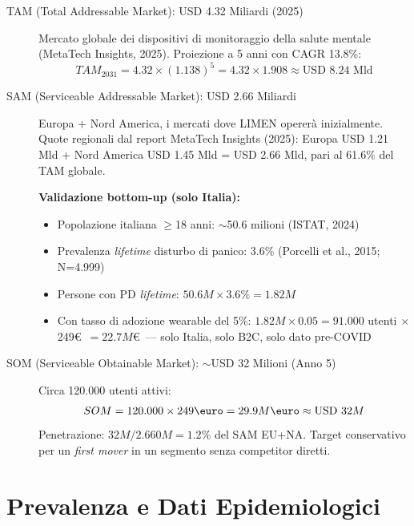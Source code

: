 \documentclass[12pt,a4paper]{article}
\begin{document}
\begin{description}
    \item[TAM (Total Addressable Market): USD 4.32 Miliardi (2025)] Mercato globale dei dispositivi di monitoraggio della salute mentale (MetaTech Insights, 2025). Proiezione a 5 anni con CAGR 13.8\%:
    $$TAM_{2031} = 4.32 \times (1.138)^5 = 4.32 \times 1.908 \approx \text{USD } 8.24 \text{ Mld}$$
    
    \item[SAM (Serviceable Addressable Market): USD 2.66 Miliardi] Europa + Nord America, i mercati dove LIMEN opererà inizialmente. Quote regionali dal report MetaTech Insights (2025): Europa USD 1.21 Mld + Nord America USD 1.45 Mld = USD 2.66 Mld, pari al 61.6\% del TAM globale.
    
    \textbf{Validazione bottom-up (solo Italia):}
    \begin{itemize}
        \item Popolazione italiana $\geq$18 anni: $\sim$50.6 milioni (ISTAT, 2024)
        \item Prevalenza \textit{lifetime} disturbo di panico: 3.6\% (Porcelli et al., 2015; N=4.999)
        \item Persone con PD \textit{lifetime}: $50.6M \times 3.6\% = 1.82M$
        \item Con tasso di adozione wearable del 5\%: $1.82M \times 0.05 = 91.000$ utenti $\times$ 249\euro\ $= 22.7M$\euro\ --- solo Italia, solo B2C, solo dato pre-COVID
    \end{itemize}
    
    \item[SOM (Serviceable Obtainable Market): $\sim$USD 32 Milioni (Anno 5)] Circa 120.000 utenti attivi:
    $$SOM = 120.000 \times 249\text{\euro} = 29.9M\text{\euro} \approx \text{USD } 32M$$
    Penetrazione: $32M / 2.660M = 1.2\%$ del SAM EU+NA. Target conservativo per un \textit{first mover} in un segmento senza competitor diretti.
\end{description}

\section{Prevalenza e Dati Epidemiologici}
\end{document}
